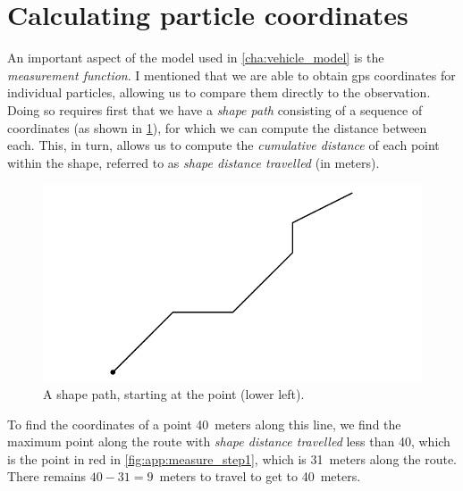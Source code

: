 \section{Calculating particle coordinates}
\label{app:pf_measurement_fun}

An important aspect of the model used in \cref{cha:vehicle_model} is the \emph{measurement function}. I mentioned that we are able to obtain \gls{gps} coordinates for individual particles, allowing us to compare them directly to the observation. Doing so requires first that we have a \emph{shape path} consisting of a sequence of coordinates (as shown in \cref{fig:app:route_shape}), for which we can compute the distance between each. This, in turn, allows us to compute the \emph{cumulative distance} of each point within the shape, referred to as \emph{shape distance travelled} (in meters).

\begin{knitrout}\small
{}\color{fgcolor}\begin{figure}[h]

{\centering \includegraphics[width=.6\textwidth]{figure/app:route_shape-1} 

}

\caption[A shape path, starting at the point (lower left)]{A shape path, starting at the point (lower left).}\label{fig:app:route_shape}
\end{figure}


\end{knitrout}

To find the coordinates of a point 40~meters along this line, we find the maximum point along the route with \emph{shape distance travelled} less than 40, which is the point in red in \cref{fig:app:measure_step1}, which is 31~meters along the route. There remains $40-31=9$~meters to travel to get to 40~meters.

